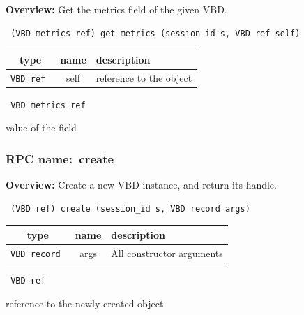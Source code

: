 {\bf Overview:} 
Get the metrics field of the given VBD.

\begin{verbatim} (VBD_metrics ref) get_metrics (session_id s, VBD ref self)\end{verbatim}



 
\vspace{0.3cm}
\begin{tabular}{|c|c|p{7cm}|}
 \hline
{\bf type} & {\bf name} & {\bf description} \\ \hline
{\tt VBD ref } & self & reference to the object \\ \hline 

\end{tabular}

\vspace{0.3cm}

{\tt 
VBD\_metrics ref
}


value of the field
\vspace{0.3cm}
\vspace{0.3cm}
\vspace{0.3cm}
\subsubsection{RPC name:~create}

{\bf Overview:} 
Create a new VBD instance, and return its handle.

\begin{verbatim} (VBD ref) create (session_id s, VBD record args)\end{verbatim}



 
\vspace{0.3cm}
\begin{tabular}{|c|c|p{7cm}|}
 \hline
{\bf type} & {\bf name} & {\bf description} \\ \hline
{\tt VBD record } & args & All constructor arguments \\ \hline 

\end{tabular}

\vspace{0.3cm}

{\tt 
VBD ref
}


reference to the newly created object
\vspace{0.3cm}
\vspace{0.3cm}
\vspace{0.3cm}
